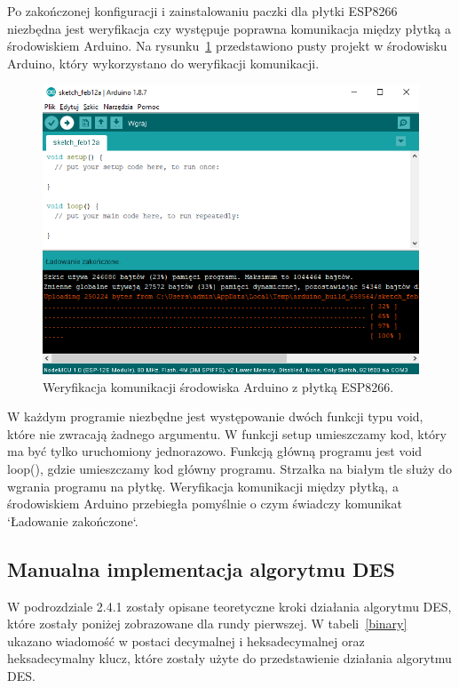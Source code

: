 \documentclass[12p]{article}
\begin{document}
Po zakończonej konfiguracji i zainstalowaniu paczki dla płytki ESP8266 niezbędna jest weryfikacja czy występuje poprawna komunikacja między płytką a środowiskiem Arduino. Na rysunku~\ref{wer_konf} przedstawiono pusty projekt w środowisku Arduino, który wykorzystano do weryfikacji komunikacji.

\begin{figure}[H]
\centering
\includegraphics[width=12cm]{wer_instalacji.png}
\caption{Weryfikacja komunikacji środowiska Arduino z płytką ESP8266.}\label{wer_konf}
\end{figure}

W każdym programie niezbędne jest występowanie dwóch funkcji typu void, które nie zwracają żadnego argumentu. W funkcji setup umieszczamy kod, który ma być tylko uruchomiony jednorazowo. Funkcją główną programu jest void loop(), gdzie umieszczamy kod główny programu. Strzałka na białym tle służy do wgrania programu na płytkę. Weryfikacja komunikacji między płytką, a środowiskiem Arduino przebiegła pomyślnie o czym świadczy komunikat `Ładowanie zakończone`.

\subsection{Manualna implementacja algorytmu DES}

\quad W podrozdziale 2.4.1 zostały opisane teoretyczne kroki działania algorytmu DES, które zostały poniżej zobrazowane dla rundy pierwszej. W tabeli~\ref{binary} ukazano wiadomość w postaci decymalnej i heksadecymalnej oraz heksadecymalny klucz, które zostały użyte do przedstawienie działania algorytmu DES. 
 
\end{document}
